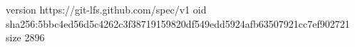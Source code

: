 version https://git-lfs.github.com/spec/v1
oid sha256:5bbc4ed56d5c4262c3f38719159820df549edd5924afb63507921cc7ef902721
size 2896
